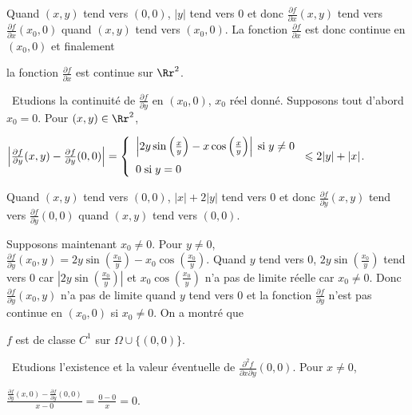 {{Quand $(x,y)$ tend vers $(0,0)$, $|y|$ tend vers $0$ et donc $ \frac{\partial f}{\partial x}(x,y)$ tend vers $ \frac{\partial f}{\partial x}(x_0,0)$ quand $(x,y)$ tend vers $(x_0,0)$. La fonction $ \frac{\partial f}{\partial x}$ est donc continue en $(x_0,0)$ et finalement

\begin{center}
la fonction $ \frac{\partial f}{\partial x}$ est continue sur $\Rr^2$.
\end{center}

\textbullet~Etudions la continuité de $ \frac{\partial f}{\partial y}$ en $(x_0,0)$, $x_0$ réel donné. Supposons tout d'abord $x_0=0$. Pour $(x,y)\in\Rr^2$,

\begin{center}
$\left| \frac{\partial f}{\partial y}(x,y)- \frac{\partial f}{\partial y}(0,0)\right|=\left\{
\begin{array}{l}
\left|2y\sin\left( \frac{x}{y}\right)-x\cos\left( \frac{x}{y}\right)\right|\;\text{si}\;y\neq0\\
\rule{0mm}{5mm}0\;\text{si}\;y=0
\end{array}
\right.\leqslant2|y|+|x|$.
\end{center}

Quand $(x,y)$ tend vers $(0,0)$, $|x|+2|y|$ tend vers $0$ et donc $ \frac{\partial f}{\partial y}(x,y)$ tend vers $ \frac{\partial f}{\partial y}(0,0)$ quand $(x,y)$ tend vers $(0,0)$. 

Supposons maintenant $x_0\neq0$. Pour $y\neq0$, $ \frac{\partial f}{\partial y}(x_0,y)=2y\sin\left( \frac{x_0}{y}\right)-x_0\cos\left( \frac{x_0}{y}\right)$. Quand $y$ tend vers $0$, $2y\sin\left( \frac{x_0}{y}\right)$ tend vers $0$ car $\left|2y\sin\left( \frac{x_0}{y}\right)\right|$ et $x_0\cos\left( \frac{x_0}{y}\right)$ n'a pas de limite réelle car $x_0\neq0$. Donc $ \frac{\partial f}{\partial y}(x_0,y)$ n'a pas de limite quand $y$ tend vers $0$ et la fonction $ \frac{\partial f}{\partial y}$ n'est pas continue en $(x_0,0)$ si $x_0\neq0$. On a montré que

\begin{center}
$f$ est de classe $C^1$ sur $\Omega\cup\{(0,0)\}$.
\end{center}

\textbullet~Etudions l'existence et la valeur éventuelle de $ \frac{\partial^2f}{\partial x\partial y}(0,0)$. Pour $x\neq0$,

\begin{center} 
$ \frac{ \frac{\partial f}{\partial y}(x,0)- \frac{\partial f}{\partial y}(0,0)}{x-0}= \frac{0-0}{x}=0$.
\end{center}

}}

